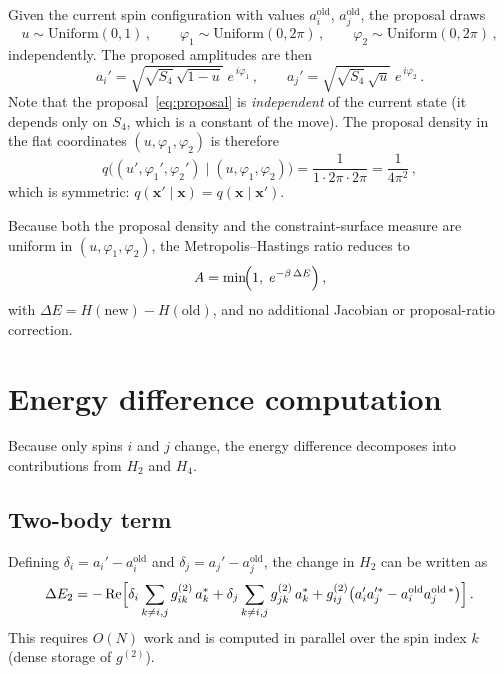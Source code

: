 \documentclass[11pt,a4paper]{article}
\newcommand{\Sfour}{S_4}
\begin{document}
Given the current spin configuration with values $a_i^{\mathrm{old}}$,
$a_j^{\mathrm{old}}$, the proposal draws
\begin{equation}\label{eq:proposal}
  u \sim \mathrm{Uniform}(0,1)\,,\qquad
  \varphi_1 \sim \mathrm{Uniform}(0,2\pi)\,,\qquad
  \varphi_2 \sim \mathrm{Uniform}(0,2\pi)\,,
\end{equation}
independently.  The proposed amplitudes are then
\begin{equation}\label{eq:new_spins}
  a_i' = \sqrt{\sqrt{\Sfour}\,\sqrt{1-u}}\;
         e^{\,i\varphi_1}\,,\qquad
  a_j' = \sqrt{\sqrt{\Sfour}\,\sqrt{u}}\;
         e^{\,i\varphi_2}\,.
\end{equation}
Note that the proposal~\eqref{eq:proposal} is \emph{independent} of the
current state (it depends only on $\Sfour$, which is a constant of the
move).  The proposal density in the flat coordinates $(u,\varphi_1,\varphi_2)$
is therefore
\[
  q\bigl((u',\varphi_1',\varphi_2') \mid (u,\varphi_1,\varphi_2)\bigr)
  = \frac{1}{1 \cdot 2\pi \cdot 2\pi}
  = \frac{1}{4\pi^2}\,,
\]
which is symmetric:
$q(\mathbf{x}'\mid\mathbf{x}) = q(\mathbf{x}\mid\mathbf{x}')$.

Because both the proposal density and the constraint-surface measure are
uniform in $(u,\varphi_1,\varphi_2)$, the Metropolis--Hastings ratio reduces
to
\begin{equation}\label{eq:acceptance}
  A = \min\!\Bigl(1,\; e^{-\beta\,\Delta E}\Bigr)\,,
\end{equation}
with $\Delta E = H(\text{new}) - H(\text{old})$, and no additional Jacobian
or proposal-ratio correction.

\section{Energy difference computation}

Because only spins $i$ and $j$ change, the energy difference decomposes
into contributions from $H_2$ and $H_4$.

\subsection{Two-body term}

Defining $\delta_i = a_i' - a_i^{\mathrm{old}}$ and
$\delta_j = a_j' - a_j^{\mathrm{old}}$, the change in $H_2$ can be
written as
\begin{equation}\label{eq:dE2}
  \Delta E_2 = -\Re\Bigl[
    \delta_i \sum_{k\neq i,j} g^{(2)}_{ik}\, a_k^*
  + \delta_j \sum_{k\neq i,j} g^{(2)}_{jk}\, a_k^*
  + g^{(2)}_{ij}\bigl(a_i' a_j'^* - a_i^{\mathrm{old}} a_j^{\mathrm{old}\,*}\bigr)
  \Bigr]\,.
\end{equation}
This requires $O(N)$ work and is computed in parallel over the spin index
$k$ (dense storage of $g^{(2)}$).
\end{document}
